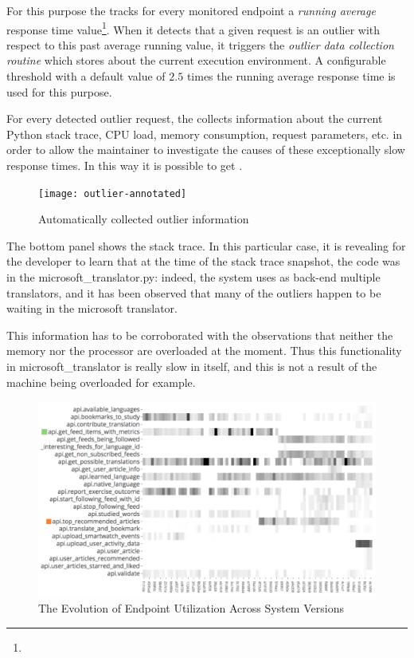   
  For this purpose the \tool tracks for every monitored endpoint a {\em running average} response time value\footnote{}. When it detects that a given request is an outlier with respect to this past average running value, it triggers the {\em outlier data collection routine} which stores  about the current execution environment. A configurable threshold with a default value of $2.5$ times the running average response time is used for this purpose. 

  For every detected outlier request, the \tool collects information about the current Python stack trace, CPU load, memory consumption, request parameters, etc. in order to allow the maintainer to investigate the causes of these exceptionally slow response times. In this way it is possible to get .


  \begin{figure}[h!]
    \centering
    \texttt{[image: outlier-annotated]}
    \caption{Automatically collected outlier information}
    \label{fig:figure1}
  \end{figure}
  

The bottom panel shows the stack trace. 
In this particular case, it is revealing for the developer to learn that at the time of the stack trace snapshot, the code was in the microsoft\_translator.py: indeed, the system uses as back-end multiple translators, and it has been observed that many of the outliers happen to be waiting in the microsoft translator.

This information has to be corroborated with the observations that neither the memory nor the processor are overloaded at the moment. Thus this functionality in microsoft\_translator is really slow in itself, and this is not a result of the machine being overloaded for example. 









\begin{figure}[h!]
  \centering
  \includegraphics[width=0.9\linewidth]{utilization-evolution}
  \caption{The Evolution of Endpoint Utilization Across System Versions}
  \label{fig:tee}
\end{figure}

